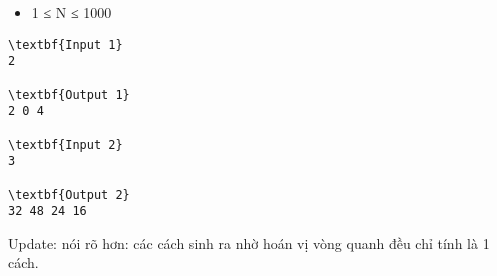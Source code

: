 \begin{itemize}
	\item 1 ≤ N ≤ 1000
\end{itemize}
\begin{verbatim}
\textbf{Input 1}
2

\textbf{Output 1}
2 0 4

\textbf{Input 2}
3

\textbf{Output 2}
32 48 24 16 \end{verbatim}




Update: nói rõ hơn: các cách sinh ra nhờ hoán vị vòng quanh đều chỉ tính là 1 cách.